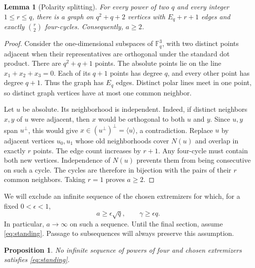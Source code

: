 \documentclass[11pt,reqno]{amsart}
\newtheorem{proposition}[theorem]{Proposition}
\newtheorem{lemma}[theorem]{Lemma}
\theoremstyle{definition}
\theoremstyle{remark}
\numberwithin{equation}{section}
\newcommand{\F}{\mathbb F}
\begin{document}
\begin{lemma}[Polarity splitting]\label{lem:split}
For every power of two $q$ and every integer $1\le r\le q$, there is a
graph on $q^2+q+2$ vertices with $E_q+r+1$ edges and exactly
$\binom r2$ four-cycles. Consequently, $a\ge2$.
\end{lemma}
\begin{proof}
Consider the one-dimensional subspaces of $\F_q^3$, with two distinct
points adjacent when their representatives are orthogonal under the
standard dot product. There are $q^2+q+1$ points. The absolute points
lie on the line $x_1+x_2+x_3=0$. Each of its $q+1$ points has degree
$q$, and every other point has degree $q+1$. Thus the graph has $E_q$
edges. Distinct polar lines meet in one point, so distinct graph
vertices have at most one common neighbor.

Let $u$ be absolute. Its neighborhood is independent. Indeed, if
distinct neighbors $x,y$ of $u$ were adjacent, then $x$ would be
orthogonal to both $u$ and $y$. Since $u,y$ span $u^\perp$, this would
give $x\in(u^\perp)^\perp=\langle u\rangle$, a contradiction.
Replace $u$ by adjacent vertices $u_0,u_1$ whose old neighborhoods
cover $N(u)$ and overlap in exactly $r$ points. The edge count increases
by $r+1$. Any four-cycle must contain both new vertices. Independence
of $N(u)$ prevents them from being consecutive on such a cycle.
The cycles are therefore in bijection with the pairs of their $r$
common neighbors. Taking $r=1$ proves $a\ge2$.
\end{proof}

We will exclude an infinite sequence of the chosen extremizers for
which, for a fixed $0<\epsilon<1$,
\begin{equation}\label{eq:standing}
 a\ge\epsilon\sqrt q,\qquad \gamma\ge\epsilon q.
\end{equation}
In particular, $a\to\infty$ on such a sequence. Until the final section,
assume \eqref{eq:standing}. Passage to subsequences will always preserve
this assumption.

\begin{proposition}\label{prop:obstruction}
No infinite sequence of powers of four and chosen extremizers satisfies
\eqref{eq:standing}.
\end{proposition}
\end{document}
